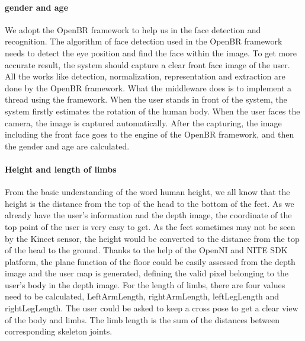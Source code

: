 \paragraph{gender and age}
We adopt the OpenBR framework to help us in the face detection and recognition. The algorithm of face detection used in the OpenBR framework needs to detect the eye position and find the face within the image. To get more accurate result, the system should capture a clear front face image of the user. 
All the works like detection, normalization, representation and extraction are done by the OpenBR framework. What the middleware does is to implement a thread using the framework. When the user stands in front of the system, the system firstly estimates the rotation of the human body. When the user faces the camera, the image is captured automatically. After the capturing, the image including the front face goes to the engine of the OpenBR framework, and then the gender and age are calculated.
\paragraph{Height and length of limbs}
From the basic understanding of the word human height, we all know that the height is the distance from the top of the head to the bottom of the feet. As we already have the user's information and the depth image, the coordinate of the top point of the user is very easy to get. 
As the feet sometimes may not be seen by the Kinect sensor, the height would be converted to the distance from the top of the head to the ground.
Thanks to the help of the OpenNI and NITE SDK platform, the plane function of the floor could be easily assessed from the depth image and the user map is generated, defining the valid pixel belonging to the user's body in the depth image.
For the length of limbs, there are four values need to be calculated, LeftArmLength, rightArmLength, leftLegLength and rightLegLength. The user could be asked to keep a cross pose to get a clear view of the body and limbs. The limb length is the sum of the distances between corresponding skeleton joints.

